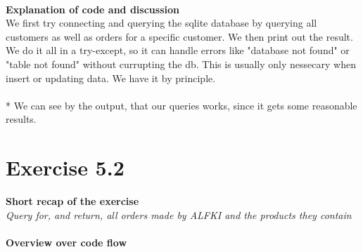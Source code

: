 \documentclass{article}
\begin{document}
~\\
\textbf{Explanation of code and discussion}\\
We first try connecting and querying the sqlite database by querying all customers as well as orders for a specific customer. We then print out the result. 
We do it all in a try-except, so it can handle errors like "database not found" or "table not found" without  currupting the db. This is usually only nessecary when insert or updating data. We have it by principle. \\
\\*
We can see by the output, that our queries works, since it gets some reasonable results. 


\section{Exercise 5.2}
\textbf{Short recap of the exercise}\\
\textit{Query for, and return, all orders made by ALFKI and the products they contain}\\
~\\
\textbf{Overview over code flow}
\end{document}
